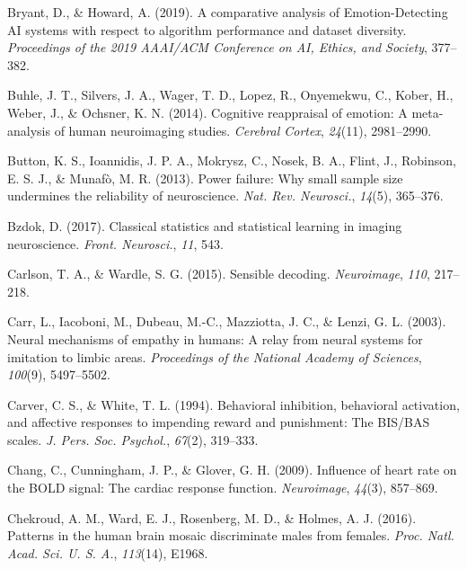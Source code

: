 \documentclass[11pt,american,]{memoir} %
\begin{document}
\leavevmode\hypertarget{ref-Bryant2019-sg}{}%
Bryant, D., \& Howard, A. (2019). A comparative analysis of Emotion-Detecting AI systems with respect to algorithm performance and dataset diversity. \emph{Proceedings of the 2019 AAAI/ACM Conference on AI, Ethics, and Society}, 377--382.

\leavevmode\hypertarget{ref-buhle2014cognitive}{}%
Buhle, J. T., Silvers, J. A., Wager, T. D., Lopez, R., Onyemekwu, C., Kober, H., Weber, J., \& Ochsner, K. N. (2014). Cognitive reappraisal of emotion: A meta-analysis of human neuroimaging studies. \emph{Cerebral Cortex}, \emph{24}(11), 2981--2990.

\leavevmode\hypertarget{ref-Button2013-zu}{}%
Button, K. S., Ioannidis, J. P. A., Mokrysz, C., Nosek, B. A., Flint, J., Robinson, E. S. J., \& Munafò, M. R. (2013). Power failure: Why small sample size undermines the reliability of neuroscience. \emph{Nat. Rev. Neurosci.}, \emph{14}(5), 365--376.

\leavevmode\hypertarget{ref-Bzdok2017-li}{}%
Bzdok, D. (2017). Classical statistics and statistical learning in imaging neuroscience. \emph{Front. Neurosci.}, \emph{11}, 543.

\leavevmode\hypertarget{ref-Carlson2015-bz}{}%
Carlson, T. A., \& Wardle, S. G. (2015). Sensible decoding. \emph{Neuroimage}, \emph{110}, 217--218.

\leavevmode\hypertarget{ref-carr2003neural}{}%
Carr, L., Iacoboni, M., Dubeau, M.-C., Mazziotta, J. C., \& Lenzi, G. L. (2003). Neural mechanisms of empathy in humans: A relay from neural systems for imitation to limbic areas. \emph{Proceedings of the National Academy of Sciences}, \emph{100}(9), 5497--5502.

\leavevmode\hypertarget{ref-Carver1994-wp}{}%
Carver, C. S., \& White, T. L. (1994). Behavioral inhibition, behavioral activation, and affective responses to impending reward and punishment: The BIS/BAS scales. \emph{J. Pers. Soc. Psychol.}, \emph{67}(2), 319--333.

\leavevmode\hypertarget{ref-Chang2009-vu}{}%
Chang, C., Cunningham, J. P., \& Glover, G. H. (2009). Influence of heart rate on the BOLD signal: The cardiac response function. \emph{Neuroimage}, \emph{44}(3), 857--869.

\leavevmode\hypertarget{ref-Chekroud2016-tc}{}%
Chekroud, A. M., Ward, E. J., Rosenberg, M. D., \& Holmes, A. J. (2016). Patterns in the human brain mosaic discriminate males from females. \emph{Proc. Natl. Acad. Sci. U. S. A.}, \emph{113}(14), E1968.
\end{document}
